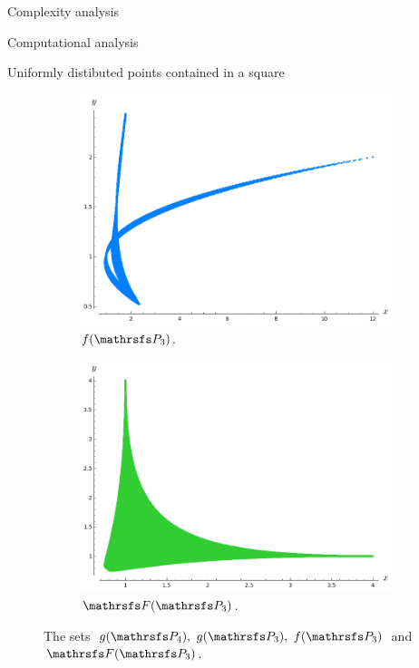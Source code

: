\documentclass[11pt, a4paper, english, twoside, notitlepage, openright]{report}
\begin{document}
\begin{chapter}{Complexity analysis}
\begin{section}{Computational analysis}
\begin{subsection}{Uniformly distibuted points contained in a square}
\begin{figure}[ht!]
\hspace{0.1cm}
\begin{subfigure}{.49\linewidth}\centering
\includegraphics[width=1\textwidth]{plots/ch5_05_P3.png}
\vspace{-0.4cm}\caption{$f(\PP_3)$.\label{fig:fP3}}
\end{subfigure}
\begin{subfigure}{.49\linewidth}\centering
\includegraphics[width=1\textwidth]{plots/ch5_06_P3.png}
\vspace{-0.4cm}\caption{$\FFF(\PP_3)$.\label{fig:FFFP3}}
\end{subfigure}
\vspace{-0.1cm}\caption{The sets $g(\PP_4),\ g(\PP_3),\ f(\PP_3)$ and $\FFF(\PP_3)$.\label{fig:discAll}}
\end{figure}


\end{subsection}
\end{section}
\end{chapter}
\end{document}
